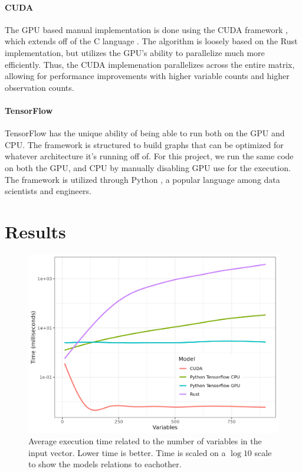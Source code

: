 \documentclass[12pt]{article}
\newcommand{\CC}{C\nolinebreak\hspace{-.05em}\raisebox{.4ex}{\tiny\bf +}\nolinebreak\hspace{-.10em}\raisebox{.4ex}{\tiny\bf +} }
\begin{document}
\paragraph{CUDA}
The GPU based manual implementation is done using the CUDA framework \cite{lib_cuda}, which extends off of the \CC language \cite{lang_c++}.
The algorithm is loosely based on the Rust implementation, but utilizes the GPU's ability to parallelize much more efficiently.
Thus, the CUDA implemenation parallelizes across the entire matrix, allowing for performance improvements with higher variable counts and higher observation counts.

\paragraph{TensorFlow}
TensorFlow \cite{lib_tensorflow} has the unique ability of being able to run both on the GPU and CPU.
The framework is structured to build graphs that can be optimized for whatever architecture it's running off of.
For this project, we run the same code on both the GPU, and CPU by manually disabling GPU use for the execution.
The framework is utilized through Python \cite{lang_python}, a popular language among data scientists and engineers.

\section{Results}

\begin{figure}[h]
	\begin{center}
		\includegraphics[width=\linewidth]{variables.png}
	\end{center}
	\caption{Average execution time related to the number of variables in the input vector. Lower time is better. Time is scaled on a $\log10$ scale to show the models relations to eachother.}
	\label{fig:graph_variables}
\end{figure}
\end{document}
